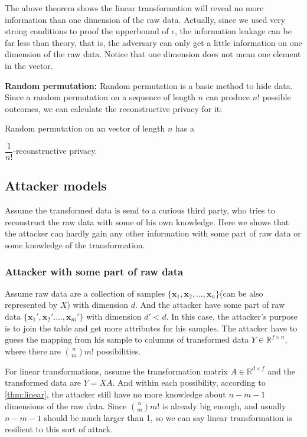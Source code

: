 The above theorem shows the linear transformation will reveal no more information than one dimension of the raw data. Actually, since we used very strong conditions to proof the upperbound of $\epsilon$, the information leakage can be far less than theory, that is, the adversary can only get a little information on one dimension of the raw data. Notice that one dimension does not mean one element in the vector.

\textbf{Random permutation: } Random permutation is a basic method to hide data. Since a random permutation on a sequence of length $n$ can produce $n!$ possible outcomes, we can calculate the reconstructive privacy for it:
\begin{theorem}
    Random permutation on an vector of length $n$ has a 
    
    $\dfrac{1}{n!}$-reconstructive privacy.
\end{theorem}
\subsection{Attacker models}
Assume the transformed data is send to a curious third party, who tries to reconstruct the raw data with some of his own knowledge. Here we shows that the attacker can hardly gain any other information with some part of raw data or some knowledge of the transformation.
\subsubsection{Attacker with some part of raw data}
Assume raw data are a collection of samples $\{\mathbf x_1, \mathbf x_2, ... , \mathbf x_n\}$(can be also represented by $X$) with dimension $d$. And the attacker have some part of raw data $\{\mathbf x_1', \mathbf x_2' ...., \mathbf x_m'\}$ with dimension $d' < d$. In this case, the attacker's purpose is to join the table and get more attributes for his samples. The attacker have to guess the mapping from his sample to columns of transformed data $Y\in\mathbb R^{f\times n}$, where there are ${n \choose m} m!$ possibilities. 

For linear transformations, assume the transformation matrix $A\in\mathbb R^{d \times f}$ and the transformed data are $Y=XA$. And within each possibility, according to \eqref{thm:linear}, the attacker still have no more knowledge about $n-m-1$ dimensions of the raw data. Since ${n \choose m} m!$ is already big enough, and usually $n - m - 1$ should be much larger than 1, so we can say linear transformation is resilient to this sort of attack.

